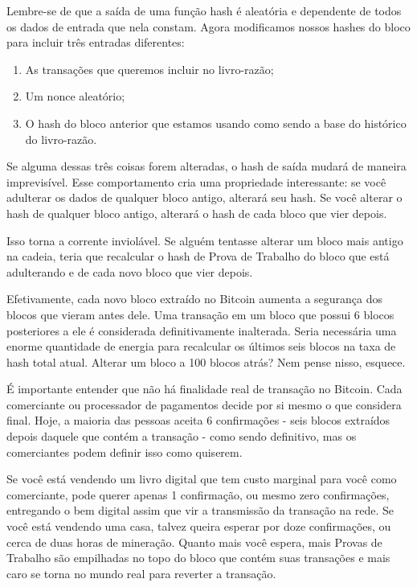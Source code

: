 Lembre-se de que a saída de uma função hash é aleatória e dependente de todos os dados de entrada que nela constam. Agora modificamos nossos hashes do bloco para incluir três entradas diferentes:

\begin{samepage}
\begin{enumerate}
\item As transações que queremos incluir no livro-razão;
\item Um nonce aleatório;
\item O hash do bloco anterior que estamos usando como sendo a base do histórico do livro-razão.
\end{enumerate}
\end{samepage}

Se alguma dessas três coisas forem alteradas, o hash de saída mudará de maneira imprevisível. Esse comportamento cria uma propriedade interessante: se você adulterar os dados de qualquer bloco antigo, alterará seu hash. Se você alterar o hash de qualquer bloco antigo, alterará o hash de cada bloco que vier depois.

Isso torna a corrente inviolável. Se alguém tentasse alterar um bloco mais antigo na cadeia, teria que recalcular o hash de Prova de Trabalho do bloco que está adulterando e de cada novo bloco que vier depois.

Efetivamente, cada novo bloco extraído no Bitcoin aumenta a segurança dos blocos que vieram antes dele. Uma transação em um bloco que possui 6 blocos posteriores a ele é considerada definitivamente inalterada. Seria necessária uma enorme quantidade de energia para recalcular os últimos seis blocos na taxa de hash total atual. Alterar um bloco a 100 blocos atrás? Nem pense nisso, esquece.

É importante entender que não há finalidade real de transação no Bitcoin. Cada comerciante ou processador de pagamentos decide por si mesmo o que considera final. Hoje, a maioria das pessoas aceita 6 confirmações - seis blocos extraídos depois daquele que contém a transação - como sendo definitivo, mas os comerciantes podem definir isso como quiserem.

Se você está vendendo um livro digital que tem custo marginal para você como comerciante, pode querer apenas 1 confirmação, ou mesmo zero confirmações, entregando o bem digital assim que vir a transmissão da transação na rede. Se você está vendendo uma casa, talvez queira esperar por doze confirmações, ou cerca de duas horas de mineração. Quanto mais você espera, mais Provas de Trabalho são empilhadas no topo do bloco que contém suas transações e mais caro se torna no mundo real para reverter a transação.


